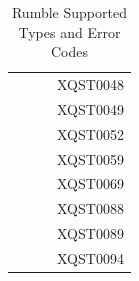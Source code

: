 \begin{table}[]
\begin{tabular}{lllr}
		&                 &  & XQST0048                                           \\
		&                 &  & XQST0049                                           \\
		&                 &  & XQST0052                                           \\
		&                 &  & XQST0059                                           \\
		&                 &  & XQST0069                                           \\
		&                 &  & XQST0088                                           \\
		&                 &  & XQST0089                                           \\
		&                 &  & XQST0094                                          
	\end{tabular}
	\caption{Rumble Supported Types and Error Codes}
	\label{tab:Phase2_Supported Types}
\end{table}

